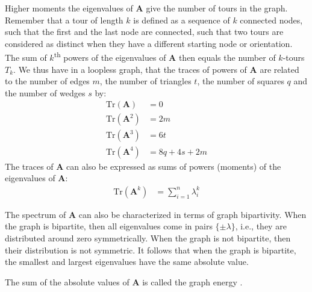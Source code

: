 \documentclass{article}
\begin{document}
Higher moments the eigenvalues of $\mathbf A$ give the number of tours
in the graph.  Remember that a tour of length $k$ is defined as a
sequence of $k$ connected nodes, such that the first and the last node
are connected, such that two tours are considered as distinct when they
have a different starting node or orientation. 
The sum of $k$\textsuperscript{th} powers of the
eigenvalues of $\mathbf A$ then equals the number of $k$-tours $T_k$. 
We thus have in a loopless graph, that the traces of powers of $\mathbf
A$ are related to the number of edges $m$, the number of triangles $t$,
the number of squares $q$ and the number of wedges $s$ by:
\begin{align*}
  \mathrm{Tr}(\mathbf A) &= 0 \\
  \mathrm{Tr}(\mathbf A^2) &= 2m \\
  \mathrm{Tr}(\mathbf A^3) &= 6t \\
  \mathrm{Tr}(\mathbf A^4) &= 8q + 4s + 2m
\end{align*}
The traces of $\mathbf A$ can also be expressed as sums of powers
(moments) of the eigenvalues of $\mathbf A$:
\begin{align*}
  \mathrm{Tr}(\mathbf A^k) &= \sum_{i=1}^n \lambda_i^k
\end{align*}

The spectrum of $\mathbf A$ can also be characterized in terms of graph
bipartivity.  When the graph is bipartite, then all eigenvalues come in
pairs $\{\pm\lambda\}$, i.e., they are distributed around zero
symmetrically.  When the graph is not bipartite, then their distribution
is not symmetric.  It follows that when the graph is bipartite, the
smallest and largest eigenvalues have the same absolute value. 

The sum of the absolute values of $\mathbf A$ is called the graph
energy \citep{b910}. 
\end{document}
